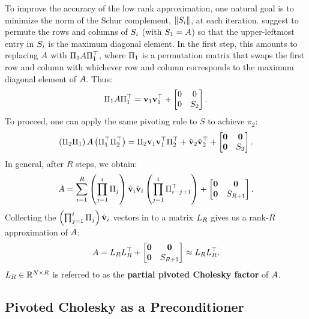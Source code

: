 To improve the accuracy of the low rank approximation, one natural goal is to minimize the norm of the Schur complement, $\Vert S_{i} \Vert$, at each iteration.
\citet{harbrecht2012low} suggest to permute the rows and columns of $S_{i}$ (with $S_{1} = A$) so that the upper-leftmost entry in $S_{i}$ is the maximum diagonal element.
In the first step, this amounts to replacing $A$ with $\Pi_{1} A \Pi_{1}^\top$, where $\Pi_{1}$ is a permutation matrix that swaps the first row and column with whichever row and column corresponds to the maximum diagonal element of $A$.
Thus:
%
\begin{align*}
  \Pi_{1} A \Pi_{1}^\top = \mathbf{v}_{1}\mathbf{v}_{1}^{\top} + \begin{bmatrix} 0 & 0 \\ 0 & S_2 \end{bmatrix}.
\end{align*}
%
To proceed, one can apply the same pivoting rule to $S$ to achieve $\pi_{2}$:
%
\begin{align*}
  \left( \Pi_{2} \Pi_{1} \right) A \left( \Pi_{1}^\top \Pi_{2}^\top \right) = \Pi_{2} \mathbf{v}_{1}\mathbf{v}_{1}^{\top} \Pi_2^\top
  + \hat {\mathbf{v}}_2 \hat {\mathbf{v}}_2^\top + \begin{bmatrix} \mathbf{0} & \mathbf{0} \\ \mathbf{0} & S_3 \end{bmatrix}.
\end{align*}
%
In general, after $R$ steps, we obtain:
\begin{align}
  A = \sum_{i=1}^{R} \left( \prod_{j=1}^i \Pi_j \right) \hat{\mathbf{v}}_{i} \hat{\mathbf{v}}_{i} \left( \prod_{j=1}^i \Pi_{i-j+1}^\top \right)
  + \begin{bmatrix} \mathbf{0} & \mathbf{0} \\ \mathbf{0} & S_{R+1} \end{bmatrix}.
\end{align}
Collecting the $\left( \prod_{j=1}^i \Pi_j \right) \hat{\mathbf{v}}_{i}$ vectors in to a matrix $L_R$ gives us a rank-$R$ approximation of $A$:
%
\begin{equation}
  A = L_{R} L_{R}^{\top} + \begin{bmatrix} \mathbf{0} & \mathbf{0} \\ \mathbf{0} & S_{R+1} \end{bmatrix} \approx L_{R} L_{R}^{\top}.
\end{equation}
%
$L_{R} \in \mathbb{R}^{N \times R}$ is referred to as the {\bf partial pivoted Cholesky factor} of $A$.

\subsection{Pivoted Cholesky as a Preconditioner}

